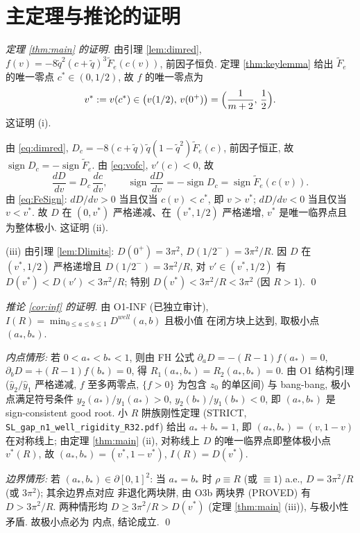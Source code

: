 \documentclass[UTF8]{ctexart}
\begin{document}
\section{主定理与推论的证明}\label{sec:cor}

\begin{proof}[定理 \ref{thm:main} 的证明]
由引理 \ref{lem:dimred}, $f(v)=-8\tilde q^2(c+\tilde q)^3\widetilde F_e(c(v))$,
前因子恒负. 定理 \ref{thm:keylemma} 给出 $\widetilde F_e$ 的唯一零点
$c^*\in(0,1/2)$, 故 $f$ 的唯一零点为
\begin{equation}
	v^*:=v(c^*)\in\bigl(v(1/2),\,v(0^+)\bigr)=\Bigl(\frac1{m+2},\,\frac12\Bigr).
	\label{eq:vstar}
\end{equation}
这证明 (i).

由 \eqref{eq:dimred}, $D_c=-8(c+\tilde q)\tilde q(1-\tilde q^2)\widetilde F_e(c)$,
前因子恒正, 故 $\operatorname{sign}D_c=-\operatorname{sign}\widetilde F_e$.
由 \eqref{eq:vofc}, $v'(c)<0$, 故
\begin{equation}
	\frac{dD}{dv}=D_c\,\frac{dc}{dv},\qquad
	\operatorname{sign}\frac{dD}{dv}
	=-\operatorname{sign}D_c=\operatorname{sign}\widetilde F_e(c(v)).
\end{equation}
由 \eqref{eq:FeSign}: $dD/dv>0$ 当且仅当 $c(v)<c^*$, 即 $v>v^*$; $dD/dv<0$
当且仅当 $v<v^*$. 故 $D$ 在 $(0,v^*)$ 严格递减、在 $(v^*,1/2)$ 严格递增,
$v^*$ 是唯一临界点且为整体极小. 这证明 (ii).

(iii) 由引理 \ref{lem:Dlimits}: $D(0^+)=3\pi^2$, $D(1/2^-)=3\pi^2/R$. 因 $D$
在 $(v^*,1/2)$ 严格递增且 $D(1/2^-)=3\pi^2/R$, 对 $v'\in(v^*,1/2)$ 有
$D(v^*)<D(v')<3\pi^2/R$; 特别 $D(v^*)<3\pi^2/R<3\pi^2$ (因 $R>1$). \qed
\end{proof}

\begin{proof}[推论 \ref{cor:inf} 的证明]
由 O1-INF (已独立审计), $I(R)=\min_{0\le a\le b\le1}D^{well}(a,b)$ 且极小值
在闭方块上达到, 取极小点 $(a_*,b_*)$.

\emph{内点情形:} 若 $0<a_*<b_*<1$, 则由 FH 公式 $\partial_aD=-(R-1)f(a_*)=0$,
$\partial_bD=+(R-1)f(b_*)=0$, 得 $R_1(a_*,b_*)=R_2(a_*,b_*)=0$. 由 O1 结构引理
($\hat y_2/\hat y_1$ 严格递减, $f$ 至多两零点, $\{f>0\}$ 为包含 $z_0$ 的单区间)
与 bang-bang, 极小点满足符号条件 $y_2(a_*)/y_1(a_*)>0$,
$y_2(b_*)/y_1(b_*)<0$, 即 $(a_*,b_*)$ 是 sign-consistent good root. 小 $R$
阱族刚性定理 (STRICT, \texttt{SL\_gap\_n1\_well\_rigidity\_R32.pdf}) 给出
$a_*+b_*=1$, 即 $(a_*,b_*)=(v,1-v)$ 在对称线上; 由定理 \ref{thm:main} (ii),
对称线上 $D$ 的唯一临界点即整体极小点 $v^*(R)$, 故 $(a_*,b_*)=(v^*,1-v^*)$,
$I(R)=D(v^*)$.

\emph{边界情形:} 若 $(a_*,b_*)\in\partial[0,1]^2$: 当 $a_*=b_*$ 时
$\rho\equiv R$ (或 $\equiv1$) a.e., $D=3\pi^2/R$ (或 $3\pi^2$); 其余边界点对应
非退化两块阱, 由 O3b 两块界 (PROVED) 有 $D>3\pi^2/R$. 两种情形均
$D\ge3\pi^2/R>D(v^*)$ (定理 \ref{thm:main} (iii)), 与极小性矛盾. 故极小点必为
内点, 结论成立. \qed
\end{proof}
\end{document}

